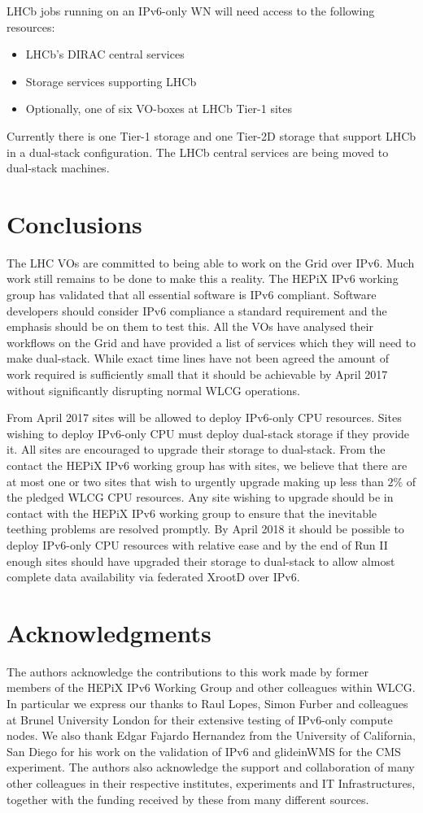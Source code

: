 \documentclass[a4paper]{jpconf}
\begin{document}
LHCb jobs running on an IPv6-only WN will need access to the following
resources:
\begin{itemize}
\item LHCb's DIRAC central services
\item Storage services supporting LHCb
\item Optionally, one of six VO-boxes at LHCb Tier-1 sites
\end{itemize}
Currently there is one Tier-1 storage and one Tier-2D storage that
support LHCb in a dual-stack configuration.  The LHCb central services
are being moved to dual-stack machines.


\section{Conclusions}
The LHC VOs are committed to being able to work on the Grid over IPv6.
Much work still remains to be done to make this a reality.  The HEPiX
IPv6 working group has validated that all essential software is IPv6
compliant.  Software developers should consider IPv6 compliance a
standard requirement and the emphasis should be on them to test this.
All the VOs have analysed their workflows on the Grid and have
provided a list of services which they will need to make dual-stack.
While exact time lines have not been agreed the amount of work
required is sufficiently small that it should be achievable by April
2017 without significantly disrupting normal WLCG operations.

From April 2017 sites will be allowed to deploy IPv6-only CPU
resources. Sites wishing to deploy IPv6-only CPU must deploy
dual-stack storage if they provide it.  All sites are encouraged to
upgrade their storage to dual-stack.  From the contact the HEPiX IPv6
working group has with sites, we believe that there are at most one or
two sites that wish to urgently upgrade making up less than $2\%$ of
the pledged WLCG CPU resources.  Any site wishing to upgrade should be
in contact with the HEPiX IPv6 working group to ensure that the
inevitable teething problems are resolved promptly.  By April 2018 it
should be possible to deploy IPv6-only CPU resources with relative
ease and by the end of Run II enough sites should have upgraded their
storage to dual-stack to allow almost complete data availability via
federated XrootD over IPv6.


\section{Acknowledgments}
The authors acknowledge the contributions to this work made by former members of the HEPiX IPv6 Working Group and other colleagues within WLCG. In particular we express our thanks to Raul Lopes, Simon Furber and colleagues at Brunel University London for their extensive testing of IPv6-only compute nodes. We also thank Edgar Fajardo Hernandez from the University of California, San Diego for his work on the validation of IPv6 and glideinWMS for the CMS experiment. The authors also acknowledge the support and collaboration of many other colleagues in their respective institutes, experiments and IT Infrastructures, together with the funding received by these from many different sources. 
\end{document}

